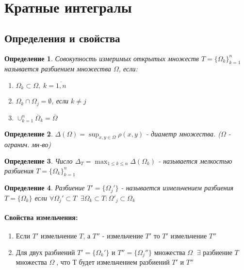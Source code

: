 \documentclass{letnab}
\newtheorem{determenition}{Определение}
\begin{document}
\section{Кратные интегралы}\vspace{-10pt}
\subsection{Определения и свойства}
\begin{determenition}\vspace{-10pt}
	Совокупность измеримых открытых множеств $T=\{\Omega_k \}_{k=1}^n $ называется разбиением множества $\Omega$, если:
	\begin{enumerate}\vspace{-10pt}
		\item $\Omega_k\subset \Omega, \; k=\overline{1,n} $\vspace{-10pt}
		\item $\Omega_k\cap \Omega_j = \emptyset $, если $k\ne j $\vspace{-10pt}
		\item $\cup_{k=1}^n \overline{\Omega}_k = \overline{\Omega}$
	\end{enumerate}
\end{determenition}

\begin{determenition}\vspace{-10pt}
	$\Delta(\Omega)=\sup_{x,y\in \Omega}\rho(x,y)$ - диаметр множества. ($\Omega  $ - огранич. мн-во)
\end{determenition}

\begin{determenition}\vspace{-10pt}
	Число $\Delta_T=\max_{1\leq k \leq n} \Delta(\Omega_k) $ - называется  мелкостью разбиения $T=\{\Omega_k\}_{k=1}^n$ 
\end{determenition}

\begin{determenition}\vspace{-10pt}
	Разбиение $T'=\{\Omega_j'\} $ - называется измельчением разбиения $T=\{\Omega_k\}$ если $\forall \Omega_j'\subset T \;\; \exists \Omega_k\subset T: \Omega'_j\subset \Omega_k $
\end{determenition}

\paragraph{Свойства измельчения:}\vspace{-10pt}
\begin{enumerate}\vspace{-10pt}
	\item Если $T'$ измельчение $T$, а $T''$ - измельчение $T'$ то $T'$ измельчение $T''$\vspace{-10pt}
	\item Для двух разбиений $T'=\{\Omega_k'\}$ и $T''=\{\Omega_j''\}$ множества $\Omega \;$  $\exists $ разбиение $T $ множества $\Omega \;$, что Т будет измельчением разбиений $T'$ и $T''$
\end{enumerate}
\end{document}
